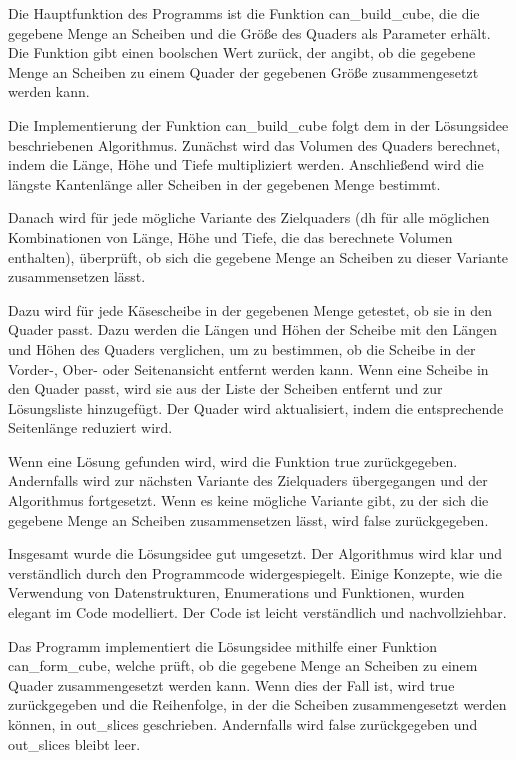 \documentclass[a4paper,10pt,ngerman]{scrartcl}
\begin{document}
    Die Hauptfunktion des Programms ist die Funktion can\_build\_cube, die die gegebene Menge an Scheiben und die Größe des Quaders als Parameter erhält.
    Die Funktion gibt einen boolschen Wert zurück, der angibt, ob die gegebene Menge an Scheiben zu einem Quader der gegebenen Größe zusammengesetzt werden kann.

    Die Implementierung der Funktion can\_build\_cube folgt dem in der Lösungsidee beschriebenen Algorithmus.
    Zunächst wird das Volumen des Quaders berechnet, indem die Länge, Höhe und Tiefe multipliziert werden.
    Anschließend wird die längste Kantenlänge aller Scheiben in der gegebenen Menge bestimmt.

    Danach wird für jede mögliche Variante des Zielquaders (dh für alle möglichen Kombinationen von Länge, Höhe und Tiefe, die das berechnete Volumen enthalten), überprüft, ob sich die gegebene Menge an Scheiben zu dieser Variante zusammensetzen lässt.

    Dazu wird für jede Käsescheibe in der gegebenen Menge getestet, ob sie in den Quader passt.
    Dazu werden die Längen und Höhen der Scheibe mit den Längen und Höhen des Quaders verglichen, um zu bestimmen, ob die Scheibe in der Vorder-, Ober- oder Seitenansicht entfernt werden kann.
    Wenn eine Scheibe in den Quader passt, wird sie aus der Liste der Scheiben entfernt und zur Lösungsliste hinzugefügt.
    Der Quader wird aktualisiert, indem die entsprechende Seitenlänge reduziert wird.

    Wenn eine Lösung gefunden wird, wird die Funktion true zurückgegeben.
    Andernfalls wird zur nächsten Variante des Zielquaders übergegangen und der Algorithmus fortgesetzt.
    Wenn es keine mögliche Variante gibt, zu der sich die gegebene Menge an Scheiben zusammensetzen lässt, wird false zurückgegeben.

    Insgesamt wurde die Lösungsidee gut umgesetzt.
    Der Algorithmus wird klar und verständlich durch den Programmcode widergespiegelt.
    Einige Konzepte, wie die Verwendung von Datenstrukturen, Enumerations und Funktionen, wurden elegant im Code modelliert.
    Der Code ist leicht verständlich und nachvollziehbar.


    Das Programm implementiert die Lösungsidee mithilfe einer Funktion can\_form\_cube, welche prüft, ob die gegebene Menge an Scheiben zu einem Quader zusammengesetzt werden kann.
    Wenn dies der Fall ist, wird true zurückgegeben und die Reihenfolge, in der die Scheiben zusammengesetzt werden können, in out\_slices geschrieben.
    Andernfalls wird false zurückgegeben und out\_slices bleibt leer.
\end{document}
